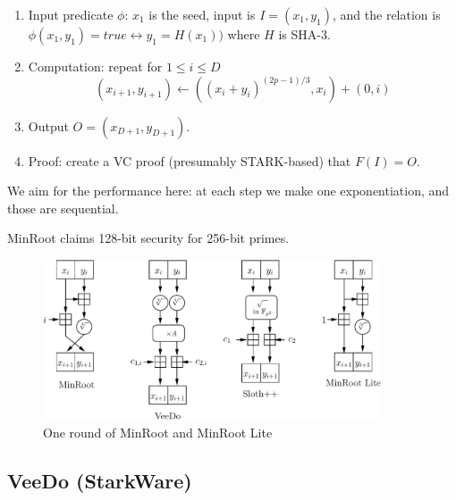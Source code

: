 \documentclass{article}
\begin{document}
\begin{enumerate}
    \item Input predicate $\phi$: $x_1$ is the seed, input is $I=(x_1,y_1)$, and the relation is $\phi(x_1,y_1)=true\leftrightarrow y_1=H(x_1))$ where $H$ is SHA-3.
    \item Computation: repeat for $1\leq i\leq D$
    $$
    (x_{i+1},y_{i+1}) \leftarrow   ((x_i+y_i)^{(2p-1)/3},x_i)+(0,i)
    $$
    \item Output $O = (x_{D+1},y_{D+1})$.
    \item Proof: create a VC proof (presumably STARK-based) that  $F(I) = O$.
\end{enumerate}

We aim for the performance here: at each step we make one exponentiation, and those are sequential.

MinRoot claims 128-bit security for 256-bit primes.

\begin{figure}
    \centering
    \includegraphics[width=10cm]{pics/mrsmall.pdf}
    \caption{One round of MinRoot and MinRoot Lite}
    \label{fig:mrl}
\end{figure}


\subsection{VeeDo (StarkWare)}
\end{document}
